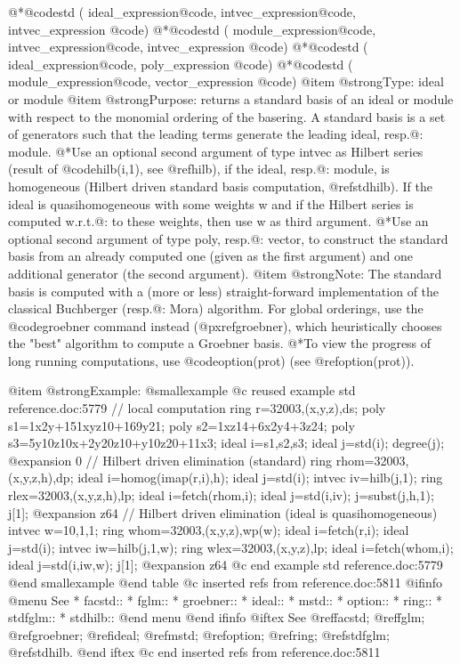 {{{{{{{@*@code{std (} ideal_expression@code{,} intvec_expression@code{,} intvec_expression @code{)}
@*@code{std (} module_expression@code{,} intvec_expression@code{,} intvec_expression @code{)}
@*@code{std (} ideal_expression@code{,} poly_expression @code{)}
@*@code{std (} module_expression@code{,} vector_expression @code{)}
@item @strong{Type:}
ideal or module
@item @strong{Purpose:}
returns a standard basis of an ideal or module with respect to the
monomial ordering of the basering.
A standard basis is a set of generators such that
the leading terms generate the leading ideal, resp.@: module.
@*Use an optional
second argument of type intvec as Hilbert series
(result of @code{hilb(i,1)}, see @ref{hilb}),
if the ideal, resp.@: module, is homogeneous
(Hilbert driven standard basis computation, @ref{stdhilb}).
If the ideal is quasihomogeneous with some weights w and if the Hilbert series
is computed w.r.t.@: to these weights, then use w as third argument.
@*Use an optional second argument of type poly, resp.@: vector,
to construct the standard basis from an already computed one (given as the
first argument) and one additional generator (the second argument).
@item @strong{Note:}
The
standard basis is computed with a (more or less) straight-forward
implementation of the classical
Buchberger (resp.@: Mora) algorithm. For global orderings, use the
@code{groebner} command instead (@pxref{groebner}), which heuristically
chooses the "best" algorithm to compute a Groebner basis.
@*To view the progress of long running computations, use
@code{option(prot)} (see @ref{option(prot)}).

@item @strong{Example:}
@smallexample
@c reused example std reference.doc:5779 
  // local computation
  ring r=32003,(x,y,z),ds;
  poly s1=1x2y+151xyz10+169y21;
  poly s2=1xz14+6x2y4+3z24;
  poly s3=5y10z10x+2y20z10+y10z20+11x3;
  ideal i=s1,s2,s3;
  ideal j=std(i);
  degree(j);
@expansion{} 0
  // Hilbert driven elimination (standard)
  ring rhom=32003,(x,y,z,h),dp;
  ideal i=homog(imap(r,i),h);
  ideal j=std(i);
  intvec iv=hilb(j,1);
  ring rlex=32003,(x,y,z,h),lp;
  ideal i=fetch(rhom,i);
  ideal j=std(i,iv);
  j=subst(j,h,1);
  j[1];
@expansion{} z64
  // Hilbert driven elimination (ideal is quasihomogeneous)
  intvec w=10,1,1;
  ring whom=32003,(x,y,z),wp(w);
  ideal i=fetch(r,i);
  ideal j=std(i);
  intvec iw=hilb(j,1,w);
  ring wlex=32003,(x,y,z),lp;
  ideal i=fetch(whom,i);
  ideal j=std(i,iw,w);
  j[1];
@expansion{} z64
@c end example std reference.doc:5779
@end smallexample
@end table
@c inserted refs from reference.doc:5811
@ifinfo
@menu
See
* facstd::
* fglm::
* groebner::
* ideal::
* mstd::
* option::
* ring::
* stdfglm::
* stdhilb::
@end menu
@end ifinfo
@iftex
See
@ref{facstd};
@ref{fglm};
@ref{groebner};
@ref{ideal};
@ref{mstd};
@ref{option};
@ref{ring};
@ref{stdfglm};
@ref{stdhilb}.
@end iftex
@c end inserted refs from reference.doc:5811

}}}}}}}
